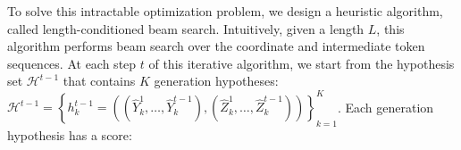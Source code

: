 \documentclass{article}
\begin{document}
To solve this intractable optimization problem, we design a heuristic algorithm, called length-conditioned beam search. 
Intuitively, given a length $L$, this algorithm performs beam search over the coordinate and intermediate token sequences.
At each step $t$ of this iterative algorithm, we start from the hypothesis set $\mathcal{H}^{t-1}$ that contains $K$ generation hypotheses:
\mbox{$\mathcal{H}^{t-1} = \left\{
h^{t-1}_k = (
    (\hat{Y}_k^1, \ldots, \hat{Y}_k^{t-1}),
    (\hat{Z}_k^1, \ldots, \hat{Z}_k^{t-1})
)
\right\}_{k=1}^K$}.
Each generation hypothesis has a score:
\end{document}
